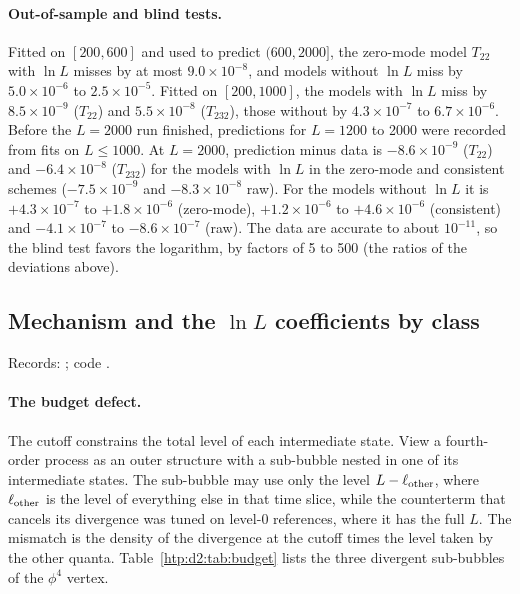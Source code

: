 \paragraph{Out-of-sample and blind tests.} Fitted on $[200,600]$ and used to predict $(600,2000]$, the zero-mode model
$T_{22}$ with $\ln L$ misses by at most $9.0\times10^{-8}$, and models without $\ln L$ miss by $5.0\times10^{-6}$ to
$2.5\times10^{-5}$. Fitted on $[200,1000]$, the models with $\ln L$ miss by $8.5\times10^{-9}$ ($T_{22}$) and
$5.5\times10^{-8}$ ($T_{232}$), those without by $4.3\times10^{-7}$ to $6.7\times10^{-6}$. Before the $L=2000$ run finished,
predictions for $L=1200$ to 2000 were recorded from fits on $L\le1000$. At $L=2000$, prediction minus data is
$-8.6\times10^{-9}$ ($T_{22}$) and $-6.4\times10^{-8}$ ($T_{232}$) for the models with $\ln L$ in the zero-mode and
consistent schemes ($-7.5\times10^{-9}$ and $-8.3\times10^{-8}$ raw). For the models without $\ln L$ it is $+4.3\times10^{-7}$
to $+1.8\times10^{-6}$ (zero-mode), $+1.2\times10^{-6}$ to $+4.6\times10^{-6}$ (consistent) and $-4.1\times10^{-7}$ to
$-8.6\times10^{-7}$ (raw). The data are accurate to about $10^{-11}$, so the blind test favors the logarithm, by factors of 5 to
500 (the ratios of the deviations above).

\subsection{Mechanism and the \texorpdfstring{$\ln L$}{ln L} coefficients by class}\label{htp:d2:app:mech}
{\small\raggedright\noindent Records: ; code .\par}

\paragraph{The budget defect.} The cutoff constrains the total level of each intermediate state. View a fourth-order
process as an outer structure with a sub-bubble nested in one of its intermediate states. The sub-bubble may use only the
level $L-\ell_{\rm other}$, where $\ell_{\rm other}$ is the level of everything else in that time slice, while the
counterterm that cancels its divergence was tuned on level-0 references, where it has the full $L$. The mismatch is the
density of the divergence at the cutoff times the level taken by the other quanta. Table~\ref{htp:d2:tab:budget} lists the
three divergent sub-bubbles of the $\phi^4$ vertex.

